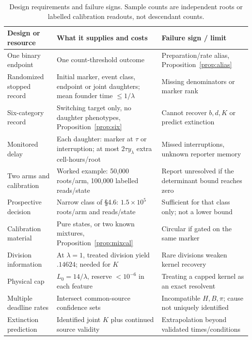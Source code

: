 \documentclass[11pt]{article}
\theoremstyle{definition}
\begin{document}
\begin{table}[tb]
\caption{Design requirements and failure signs. Sample counts are independent
roots or labelled calibration readouts, not descendant counts.}
\label{tab:design}\centering\small
\begin{tabular}{>{\raggedright\arraybackslash}p{.22\linewidth}>{\raggedright\arraybackslash}p{.43\linewidth}>{\raggedright\arraybackslash}p{.25\linewidth}}
\toprule
Design or resource & What it supplies and costs & Failure sign / limit\\
\midrule
One binary endpoint & One count-threshold outcome & Preparation/rate alias, Proposition~\ref{prop:alias}\\
Randomized stopped record & Initial marker, event class, endpoint or joint daughters; mean founder time $\le1/\lambda$ & Missing denominators or marker rank\\
Six-category record & Switching target only, no daughter phenotypes, Proposition~\ref{prop:six} & Cannot recover $b,d,K$ or predict extinction\\
Monitored delay & Each daughter: marker at $\tau$ or interruption; at most $2\tau y_\lambda$ extra cell-hours/root & Missed interruptions, unknown reporter memory\\
Two arms and calibration & Worked example: 50,000 roots/arm, 100,000 labelled reads/state & Report unresolved if the determinant bound reaches zero\\
Prospective decision & Narrow class of \S4.6: $1.5\times10^5$ roots/arm and reads/state & Sufficient for that class only; not a lower bound\\
Calibration material & Pure states, or two known mixtures, Proposition~\ref{prop:mixcal} & Circular if gated on the same marker\\
Division information & At $\lambda=1$, treated division yield $.14624$; needed for $K$ & Rare divisions weaken kernel recovery\\
Physical cap & $L_0=14/\lambda$, reserve $<10^{-6}$ in each feature & Treating a capped kernel as an exact resolvent\\
Multiple deadline rates & Intersect common-source confidence sets & Incompatible $H,B,\pi$; cause not uniquely identified\\
Extinction prediction & Identified joint $K$ plus continued source validity & Extrapolation beyond validated times/conditions\\
\bottomrule
\end{tabular}
\end{table}
\end{document}
